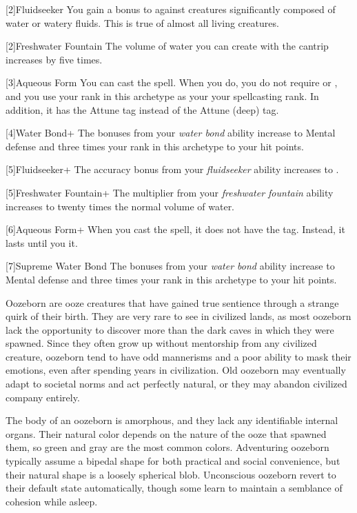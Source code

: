     [2]{Fluidseeker} You gain a  bonus to  against creatures significantly composed of water or watery fluids.
    This is true of almost all living creatures.

    [2]{Freshwater Fountain} The volume of water you can create with the  cantrip increases by five times.

    [3]{Aqueous Form} You can cast the  spell.
    When you do, you do not require  or , and you use your rank in this archetype as your your spellcasting rank.
    In addition, it has the Attune tag instead of the Attune (deep) tag.

    [4]{Water Bond+} The bonuses from your \textit{water bond} ability increase to  Mental defense and three times your rank in this archetype to your hit points.

    [5]{Fluidseeker+} The accuracy bonus from your \textit{fluidseeker} ability increases to .

    [5]{Freshwater Fountain+} The multiplier from your \textit{freshwater fountain} ability increases to twenty times the normal volume of water.

    [6]{Aqueous Form+} When you cast the  spell, it does not have the  tag.
    Instead, it lasts until you  it.

    [7]{Supreme Water Bond} The bonuses from your \textit{water bond} ability increase to  Mental defense and three times your rank in this archetype to your hit points.

  Oozeborn are ooze creatures that have gained true sentience through a strange quirk of their birth.
  They are very rare to see in civilized lands, as most oozeborn lack the opportunity to discover more than the dark caves in which they were spawned.
  Since they often grow up without mentorship from any civilized creature, oozeborn tend to have odd mannerisms and a poor ability to mask their emotions, even after spending years in civilization.
  Old oozeborn may eventually adapt to societal norms and act perfectly natural, or they may abandon civilized company entirely.

  The body of an oozeborn is amorphous, and they lack any identifiable internal organs.
  Their natural color depends on the nature of the ooze that spawned them, so green and gray are the most common colors.
  Adventuring oozeborn typically assume a bipedal shape for both practical and social convenience, but their natural shape is a loosely spherical blob.
  Unconscious oozeborn revert to their default state automatically, though some learn to maintain a semblance of cohesion while asleep.

